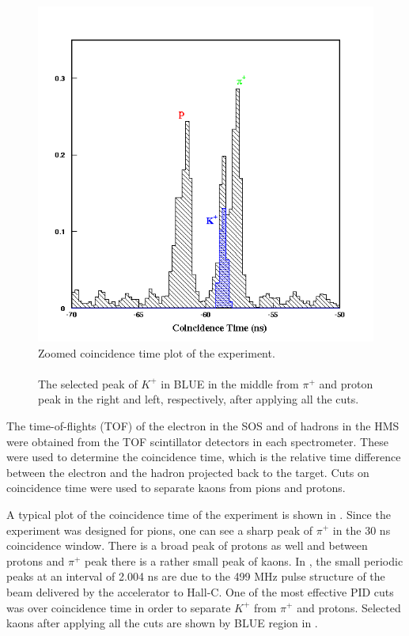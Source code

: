 \begin{figure}[!tbp]
  \centering
  \includegraphics[trim = 1mm 1mm 1mm 1mm,clip,width=0.8\columnwidth]{cointime2}
  \caption[Zoomed coincidence time plot of the experiment.]{\label{fig:cointime2}Zoomed coincidence time plot of the experiment.\\\\ The selected peak of $K^+$ in BLUE in the middle from $\pi^+$ and proton peak in the right and left, respectively, after applying all the cuts.}
\end{figure}

The time-of-flights (TOF) of the electron in the SOS and of hadrons in the HMS were obtained from the TOF scintillator detectors in each spectrometer. These were used to determine the coincidence time, which is the relative time difference between the electron and the hadron projected back to the target. Cuts on coincidence time were used to separate kaons from pions and protons.

A typical plot of the coincidence time of the experiment is shown in . Since the experiment was designed for pions, one can see a sharp peak of $\pi^+$ in the 30 ns coincidence window. There is a broad peak of protons as well and between protons and $\pi^+$ peak there is a rather small peak of kaons. In , the small periodic peaks at an interval of 2.004 ns are due to the 499 MHz pulse structure of the beam delivered by the accelerator to Hall-C. One of the most effective PID cuts was over coincidence time in order to separate $K^+$ from $\pi^+$ and protons. Selected kaons after applying all the cuts are shown by BLUE region in .

